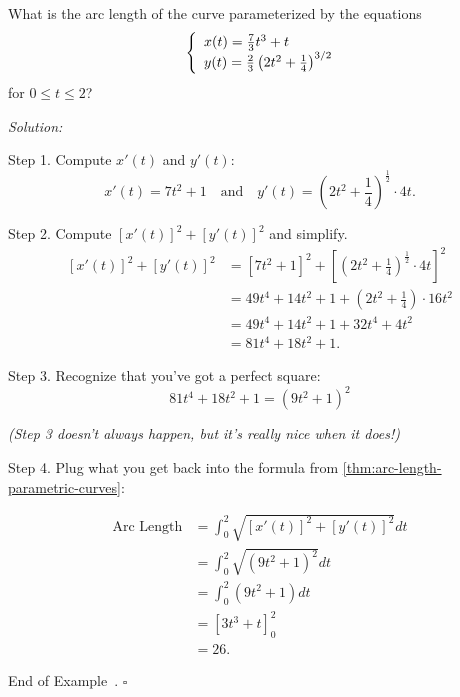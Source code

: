 \documentclass[10pt]{article}
\theoremstyle{definition}
\newtheorem{example}[theorem]{Example}
\renewenvironment{example}
{\begin{oldexample}}
  {\par\smallskip\hfill   End of Example~\theexample. $\square$    \par\end{oldexample}}
\newcommand{\1}[1]{\textbf{1}_{\left[#1\right]}} %
\begin{document}
\begin{max-comment}
\begin{example}[Arc length]
  What is the arc length of the curve parameterized by the equations
  \begin{equation*}
    \left\{ \begin{array}{l@{}l}
        x(t) = \frac{7}{3}t^{3}+t \\
        y(t) = \frac{2}{3}\left( 2t^{2}+\frac{1}{4} \right)^{3/2}  \end{array}\right.
  \end{equation*}
  for $0 \leq t \leq 2$?
  
  \noindent \textit{Solution:}

  Step 1. Compute $x'(t)$ and $y'(t)$:
  \begin{equation*}
    x'(t) = 7t^{2}+1
    \quad \text{and} \quad 
    y'(t) = \left(2t^{2}+\frac{1}{4}\right)^{\frac{1}{2}}\cdot 4t.
  \end{equation*}

  Step 2. Compute $\left[ x'(t) \right]^{2}+\left[ y'(t) \right]^{2}$ and
  simplify.
  \begin{align*}
    \left[ x'(t) \right]^{2}+\left[ y'(t) \right]^{2} 
    &=\left[ 7t^{2}+1 \right]^{2} + \left[ \left( 2t^{2}+\frac{1}{4} \right)^{\frac{1}{2}}\cdot 4t  \right]^{2}\\  
    &= 49 t^{4} + 14 t^{2}+1 + \left( 2t^{2}+\frac{1}{4} \right)\cdot 16t^{2}\\ 
    &= 49t^{4}+ 14 t^{2} + 1 + 32 t^{4}+ 4 t^{2}\\
    &= 81 t^{4}+ 18 t^{2}+1.
  \end{align*}

  Step 3. Recognize that you've got a perfect square:
  \begin{equation*}
    81 t^{4}+ 18 t^{2}+1 = \left( 9t^{2}+1 \right)^{2}
  \end{equation*}

  \quad \textit{(Step 3 doesn't always happen, but it's \textit{really} nice
    when it does!)}
  

  Step 4. Plug what you get back into the formula from
  \cref{thm:arc-length-parametric-curves}:

  \begin{align*}
    \text{Arc Length} 
    &= \int_{0}^{2}  \sqrt{\left[ x'(t) \right]^{2} + \left[ y'(t) \right]^{2}  } dt\\
    &= \int_{0}^{2} \sqrt{ \left( 9t^{2}+1 \right)^{2} }dt\\ 
    &= \int_{0}^{2}  (9t^{2}+1) dt\\
    &= \left[ 3t^{3} + t \right]^{2}_{0}\\ 
    &= 26.
  \end{align*}
  

\end{example}
\end{max-comment}
\end{document}
